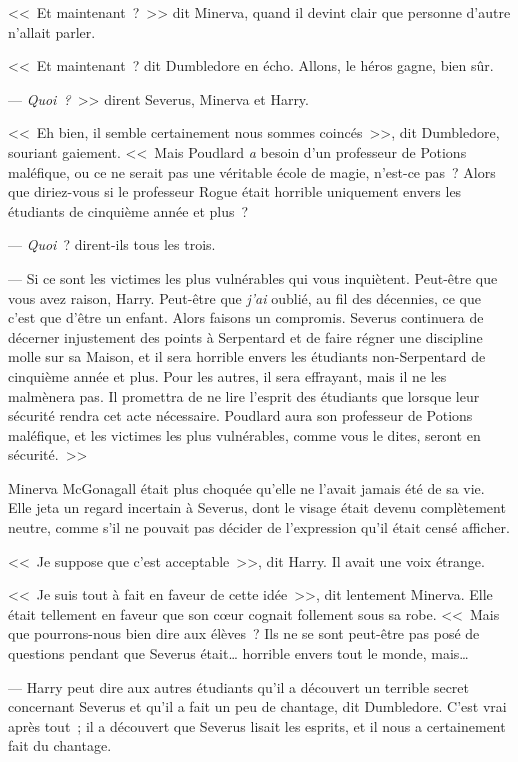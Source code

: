 <<~Et maintenant~?~>> dit Minerva, quand il devint clair que personne d'autre n'allait parler.

<<~Et maintenant~? dit Dumbledore en écho. Allons, le héros gagne, bien sûr.

--- \emph{Quoi~?}~>> dirent Severus, Minerva et Harry.

<<~Eh bien, il semble certainement nous sommes coincés~>>, dit Dumbledore, souriant gaiement. <<~Mais Poudlard \emph{a} besoin d'un professeur de Potions maléfique, ou ce ne serait pas une véritable école de magie, n'est-ce pas~? Alors que diriez-vous si le professeur Rogue était horrible uniquement envers les étudiants de cinquième année et plus~?

--- \emph{Quoi}~? dirent-ils tous les trois.

--- Si ce sont les victimes les plus vulnérables qui vous inquiètent. Peut-être que vous avez raison, Harry. Peut-être que \emph{j'ai} oublié, au fil des décennies, ce que c'est que d'être un enfant. Alors faisons un compromis. Severus continuera de décerner injustement des points à Serpentard et de faire régner une discipline molle sur sa Maison, et il sera horrible envers les étudiants non-Serpentard de cinquième année et plus. Pour les autres, il sera effrayant, mais il ne les malmènera pas. Il promettra de ne lire l'esprit des étudiants que lorsque leur sécurité rendra cet acte nécessaire. Poudlard aura son professeur de Potions maléfique, et les victimes les plus vulnérables, comme vous le dites, seront en sécurité.~>>

Minerva McGonagall était plus choquée qu'elle ne l'avait jamais été de sa vie. Elle jeta un regard incertain à Severus, dont le visage était devenu complètement neutre, comme s'il ne pouvait pas décider de l'expression qu'il était censé afficher.

<<~Je suppose que c'est acceptable~>>, dit Harry. Il avait une voix étrange.

<<~Je suis tout à fait en faveur de cette idée~>>, dit lentement Minerva. Elle était tellement en faveur que son cœur cognait follement sous sa robe. <<~Mais que pourrons-nous bien dire aux élèves~? Ils ne se sont peut-être pas posé de questions pendant que Severus était… horrible envers tout le monde, mais…

--- Harry peut dire aux autres étudiants qu'il a découvert un terrible secret concernant Severus et qu'il a fait un peu de chantage, dit Dumbledore. C'est vrai après tout~; il a découvert que Severus lisait les esprits, et il nous a certainement fait du chantage.

